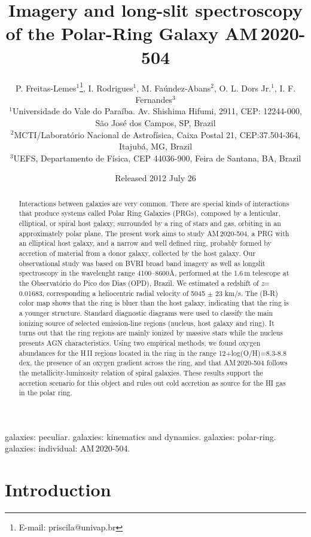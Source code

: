 \documentclass[useAMS,usenatbib]{mn2e}
\title{Imagery and long-slit spectroscopy of the Polar-Ring Galaxy
\mbox{AM\,2020-504}}
\author[Freitas-Lemes, P. et al.]
  {P. Freitas-Lemes$^1$\thanks{E-mail: priscila@univap.br}, I.
Rodrigues$^1$, M. Fa\'undez-Abans$^2$,
 O. L. Dors Jr.$^1$, \newauthor I. F. Fernandes$^3$\\
  $^1$Universidade do Vale do Para\'iba. Av. Shishima Hifumi, 2911, CEP:
12244-000, S\~ao Jos\'e dos Campos, SP, Brazil\\
  $^2$MCTI/Laborat\'orio Nacional de Astrof\'isica, Caixa Postal 21, 
CEP:37.504-364, Itajub\'a, MG, Brazil \\
  $^3$UEFS, Departamento de F\'isica, CEP 44036-900, Feira de Santana, BA,
Brazil}
\date{Released 2012 July 26}
\begin{document}


\maketitle
\begin{abstract}

Interactions between galaxies are very common. There are special kinds of
interactions that produce systems called Polar Ring Galaxies (PRGs), composed by
a lenticular, elliptical, or spiral host galaxy, surrounded by a ring of stars
and gas, orbiting in an approximately polar plane. The present work aims to
study \mbox{AM\,2020-504}, a PRG with an elliptical host galaxy, and a narrow
and well defined ring, probably formed by accretion of material from a donor
galaxy, collected by the host galaxy. Our observational study was based on BVRI
broad band imagery as well as longslit spectroscopy in the wavelenght range
4100--8600\AA,  performed at the 1.6\,m  telescope at the Observat\'orio do Pico
dos Dias (OPD), Brazil. We estimated a redshift of \textit{z}= 0.01683,
corresponding a heliocentric radial velocity of 5045 $\pm$ 23 km/s. The (B-R)
color map shows that the ring is bluer than the host galaxy, indicating that the
ring is a younger structure. Standard diagnostic diagrams were used to classify
the main ionizing source of selected emission-line regions (nucleus, host galaxy
and ring). It turns out that the ring regions are mainly ionized by
massive stars while the nucleus presents AGN characteristics. Using two
empirical methods,  we found  oxygen abundances  for the H\,II regions located
in the ring in the range 12+log(O/H)=8.3-8.8 dex, the presence of an oxygen
gradient across the ring, and that  \mbox{AM\,2020-504}  follows the
metallicity-luminosity relation of spiral galaxies. These results support the
accretion scenario for this object and rules out cold accretion as source for 
the HI gas in the polar ring.
 
\end{abstract}

\begin{keywords}
galaxies: peculiar. galaxies: kinematics and dynamics. galaxies: polar-ring.
galaxies: individual: \mbox{AM\,2020-504}.
\end{keywords}

\section{Introduction}
\end{document}

